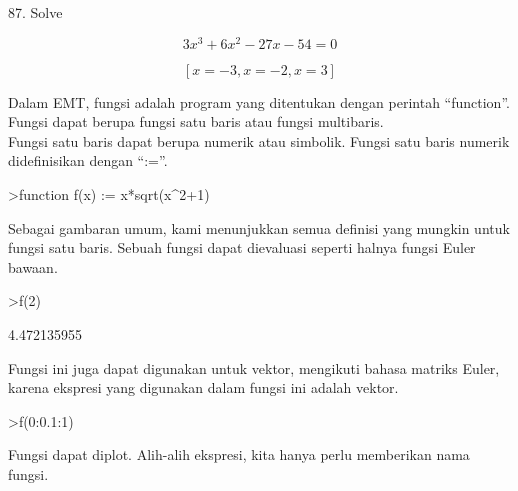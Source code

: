 \documentclass[a4paper,10pt]{article}
\begin{document}
\begin{eulernotebook}
\begin{eulercomment}
\begin{eulercomment}
\begin{eulercomment}
87. Solve\\
\end{eulercomment}
\begin{eulerformula}
\[
3x^3+6x^2-27x-54=0
\]
\end{eulerformula}
\begin{eulerformula}
\[
\left[ x=-3 , x=-2 , x=3 \right] 
\]
\end{eulerformula}
\begin{eulercomment}
Dalam EMT, fungsi adalah program yang ditentukan dengan perintah
“function”. Fungsi dapat berupa fungsi satu baris atau fungsi
multibaris.\\
Fungsi satu baris dapat berupa numerik atau simbolik. Fungsi satu
baris numerik didefinisikan dengan “:=”.
\end{eulercomment}
\begin{eulerprompt}
>function f(x) := x*sqrt(x^2+1)
\end{eulerprompt}
\begin{eulercomment}
Sebagai gambaran umum, kami menunjukkan semua definisi yang mungkin
untuk fungsi satu baris. Sebuah fungsi dapat dievaluasi seperti halnya
fungsi Euler bawaan.
\end{eulercomment}
\begin{eulerprompt}
>f(2)
\end{eulerprompt}
\begin{euleroutput}
  4.472135955
\end{euleroutput}
\begin{eulercomment}
Fungsi ini juga dapat digunakan untuk vektor, mengikuti bahasa matriks
Euler, karena ekspresi yang digunakan dalam fungsi ini adalah vektor.
\end{eulercomment}
\begin{eulerprompt}
>f(0:0.1:1)
\end{eulerprompt}
\begin{euleroutput}
  [0,  0.100499,  0.203961,  0.313209,  0.430813,  0.559017,  0.699714,
  0.854459,  1.0245,  1.21083,  1.41421]
\end{euleroutput}
\begin{eulercomment}
Fungsi dapat diplot. Alih-alih ekspresi, kita hanya perlu memberikan
nama fungsi.


\end{eulercomment}
\end{eulercomment}
\end{eulercomment}
\end{eulernotebook}
\end{document}
